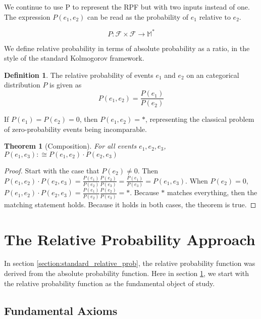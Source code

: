 \documentclass[twoside]{article}
\theoremstyle{plain}%
\newtheorem{theorem}{Theorem}[section]
\theoremstyle{definition}
\newtheorem{definition}{Definition}[section]
\theoremstyle{remark}
\begin{document}
We continue to use P to represent the RPF but with two inputs instead of one. The expression \(P(e_1, e_2)\) can be read as the probability of \(e_1\) relative to \(e_2\).

\[P: \mathcal{F} \times \mathcal{F} \rightarrow \mathbb{M}^*\]

We define relative probability in terms of absolute probability as a ratio, in the style of the standard Kolmogorov framework.

\begin{definition}
\label{def:ratio}
The relative probability of events \(e_1\) and \(e_2\) on an categorical distribution \(P\) is given as
\[P(e_1, e_2) = \frac{P(e_1)}{P(e_2)}\]
\end{definition}

If \(P(e_1) = P(e_2) = 0\), then \(P(e_1, e_2) = \ast\), representing the classical problem of zero-probability events being incomparable.

\begin{theorem}[Composition]
For all events \(e_1, e_2, e_3\), \(P(e_1, e_3) :\cong P(e_1, e_2) \cdot P(e_2, e_3)\)
\end{theorem}

\begin{proof}
Start with the case that \(P(e_2)\neq 0\). Then \(P(e_1, e_2) \cdot P(e_2, e_3) = \frac{P(e_1)}{P(e_2)}\frac{P(e_2)}{P(e_3)} = \frac{P(e_1)}{P(e_3)} = P(e_1, e_3)\). When \(P(e_2) = 0\), \(P(e_1, e_2) \cdot P(e_2, e_3) = \frac{P(e_1)}{P(e_2)}\frac{P(e_2)}{P(e_3)} = \ast\). Because \(\ast\) matches everything, then the matching statement holds. Because it holds in both cases, the theorem is true.
\end{proof}

\section{The Relative Probability Approach}
\label{section:new_relative_prob}

In section \ref{section:standard_relative_prob}, the relative probability function was derived from the absolute probability function. Here in section \ref{section:new_relative_prob}, we start with the relative probability function as the fundamental object of study.

\subsection{Fundamental Axioms}
\end{document}
